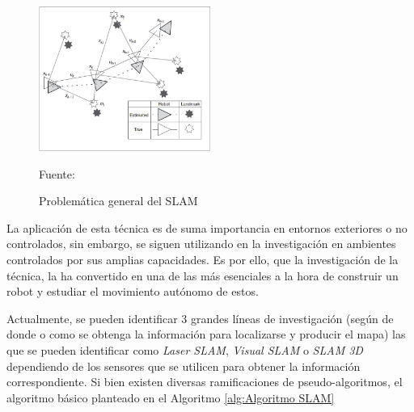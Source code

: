\begin{figure}[H]
    \centering
    \includegraphics[width=0.5\textwidth]{figures/02marco_conceptual/slam_definicion.JPG}
    \caption{\label{fig:problema_slam} Problemática general del SLAM} 
    Fuente: \cite{durrant-whyte_simultaneous_2006}
\end{figure}

La aplicación de esta técnica es de suma importancia en entornos exteriores o no controlados, sin embargo, se siguen utilizando en la investigación en ambientes controlados por sus amplias capacidades. Es por ello, que la investigación de la técnica, la ha convertido en una de las más esenciales a la hora de construir un robot y estudiar el movimiento autónomo de estos.

Actualmente, se pueden identificar 3 grandes líneas de investigación (según de donde o como se obtenga la información para localizarse y producir el mapa) las que se pueden identificar como \textit{Laser SLAM}, \textit{Visual SLAM} o \textit{SLAM 3D} dependiendo de los sensores que se utilicen para obtener la información correspondiente. Si bien existen diversas ramificaciones de pseudo-algoritmos, el algoritmo básico planteado en el Algoritmo \ref{alg:Algoritmo SLAM}

